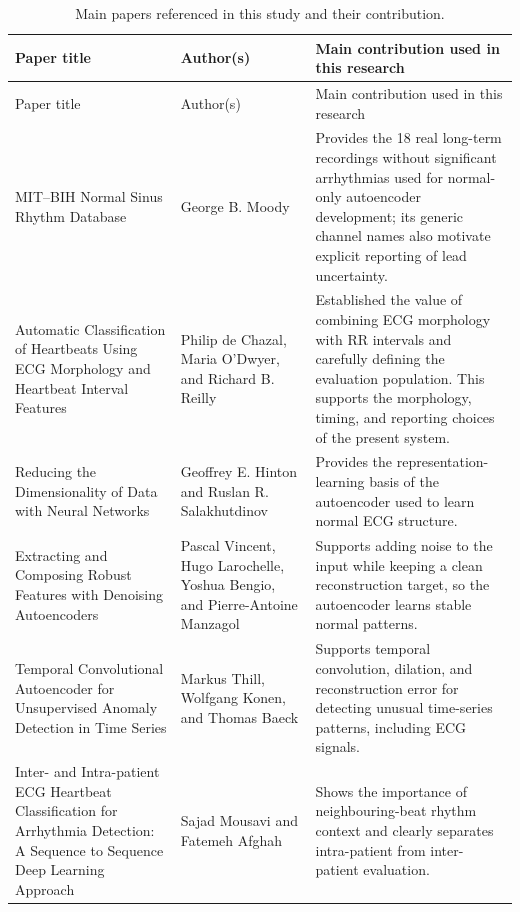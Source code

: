\begingroup
\footnotesize
\setlength{\tabcolsep}{4pt}
\begin{longtable}{>{\raggedright\arraybackslash}p{5.0cm}>{\raggedright\arraybackslash}p{3.4cm}>{\raggedright\arraybackslash}p{5.3cm}}
\caption{Main papers referenced in this study and their contribution.}\label{tab:literature-comparison}\\
\toprule
Paper title & Author(s) & Main contribution used in this research\\
\midrule
\endfirsthead
\toprule
Paper title & Author(s) & Main contribution used in this research\\
\midrule
\endhead
MIT--BIH Normal Sinus Rhythm Database \cite{nsrdb} & George B. Moody & Provides the 18 real long-term recordings without significant arrhythmias used for normal-only autoencoder development; its generic channel names also motivate explicit reporting of lead uncertainty.\\
Automatic Classification of Heartbeats Using ECG Morphology and Heartbeat Interval Features \cite{dechazal2004heartbeat} & Philip de Chazal, Maria O'Dwyer, and Richard B. Reilly & Established the value of combining ECG morphology with RR intervals and carefully defining the evaluation population. This supports the morphology, timing, and reporting choices of the present system.\\
Reducing the Dimensionality of Data with Neural Networks \cite{hinton2006autoencoder} & Geoffrey E. Hinton and Ruslan R. Salakhutdinov & Provides the representation-learning basis of the autoencoder used to learn normal ECG structure.\\
Extracting and Composing Robust Features with Denoising Autoencoders \cite{vincent2008denoising} & Pascal Vincent, Hugo Larochelle, Yoshua Bengio, and Pierre-Antoine Manzagol & Supports adding noise to the input while keeping a clean reconstruction target, so the autoencoder learns stable normal patterns.\\
Temporal Convolutional Autoencoder for Unsupervised Anomaly Detection in Time Series \cite{thill2021tcnae} & Markus Thill, Wolfgang Konen, and Thomas Baeck & Supports temporal convolution, dilation, and reconstruction error for detecting unusual time-series patterns, including ECG signals.\\
Inter- and Intra-patient ECG Heartbeat Classification for Arrhythmia Detection: A Sequence to Sequence Deep Learning Approach \cite{mousavi2019seq2seq} & Sajad Mousavi and Fatemeh Afghah & Shows the importance of neighbouring-beat rhythm context and clearly separates intra-patient from inter-patient evaluation.\\

\end{longtable}
